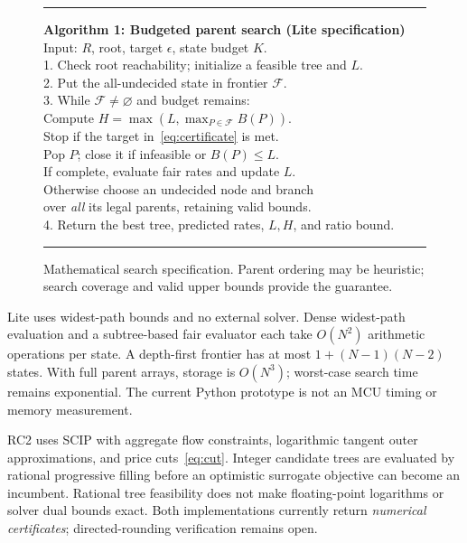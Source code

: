 \documentclass[conference,letterpaper]{IEEEtran}
\begin{document}
\begin{figure}[t]
\small\hrule\vspace{4pt}
\textbf{Algorithm 1: Budgeted parent search (Lite specification)}\\
Input: $R$, root, target $\epsilon$, state budget $K$.\\
1. Check root reachability; initialize a feasible tree and $L$.\\
2. Put the all-undecided state in frontier $\mathcal F$.\\
3. While $\mathcal F\ne\varnothing$ and budget remains:\\
\hspace*{1em}Compute $H=\max(L,\max_{P\in\mathcal F}B(P))$.\\
\hspace*{1em}Stop if the target in~\eqref{eq:certificate} is met.\\
\hspace*{1em}Pop $P$; close it if infeasible or $B(P)\le L$.\\
\hspace*{1em}If complete, evaluate fair rates and update $L$.\\
\hspace*{1em}Otherwise choose an undecided node and branch\\
\hspace*{1em}over \emph{all} its legal parents, retaining valid bounds.\\
4. Return the best tree, predicted rates, $L,H$, and ratio bound.\vspace{4pt}\hrule
\caption{Mathematical search specification. Parent ordering may be heuristic; search coverage and valid upper bounds provide the guarantee.}
\end{figure}

Lite uses widest-path bounds and no external solver. Dense widest-path evaluation and a subtree-based fair evaluator each take $O(N^2)$ arithmetic operations per state. A depth-first frontier has at most $1+(N-1)(N-2)$ states. With full parent arrays, storage is $O(N^3)$; worst-case search time remains exponential. The current Python prototype is not an MCU timing or memory measurement.

RC2 uses SCIP with aggregate flow constraints, logarithmic tangent outer approximations, and price cuts~\eqref{eq:cut}. Integer candidate trees are evaluated by rational progressive filling before an optimistic surrogate objective can become an incumbent. Rational tree feasibility does not make floating-point logarithms or solver dual bounds exact. Both implementations currently return \emph{numerical certificates}; directed-rounding verification remains open.
\end{document}
